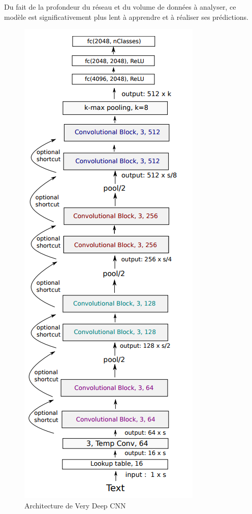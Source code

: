 \noindent Du fait de la profondeur du réseau et du volume de données à analyser, ce modèle est significativement plus lent à apprendre et à réaliser ses prédictions.

\begin{figure}
\centering
\includegraphics[scale=0.3]{./tex/natural-language-processing/vdnn.png}
\caption{Architecture de Very Deep CNN}
\label{vdnn}
\end{figure}

